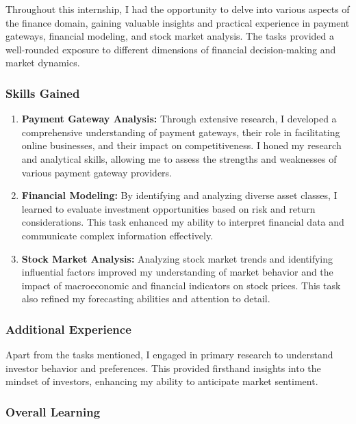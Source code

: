 Throughout this internship, I had the opportunity to delve into various aspects of the finance domain, gaining valuable insights and practical experience in payment gateways, financial modeling, and stock market analysis. The tasks provided a well-rounded exposure to different dimensions of financial decision-making and market dynamics.

\subsubsection{Skills Gained}

\begin{enumerate}
  \item \textbf{Payment Gateway Analysis:} Through extensive research, I developed a comprehensive understanding of payment gateways, their role in facilitating online businesses, and their impact on competitiveness. I honed my research and analytical skills, allowing me to assess the strengths and weaknesses of various payment gateway providers.
  
  \item \textbf{Financial Modeling:} By identifying and analyzing diverse asset classes, I learned to evaluate investment opportunities based on risk and return considerations. This task enhanced my ability to interpret financial data and communicate complex information effectively.
  
  \item \textbf{Stock Market Analysis:} Analyzing stock market trends and identifying influential factors improved my understanding of market behavior and the impact of macroeconomic and financial indicators on stock prices. This task also refined my forecasting abilities and attention to detail.
\end{enumerate}

\subsubsection{Additional Experience}

Apart from the tasks mentioned, I engaged in primary research to understand investor behavior and preferences. This provided firsthand insights into the mindset of investors, enhancing my ability to anticipate market sentiment.

\subsubsection{Overall Learning}

